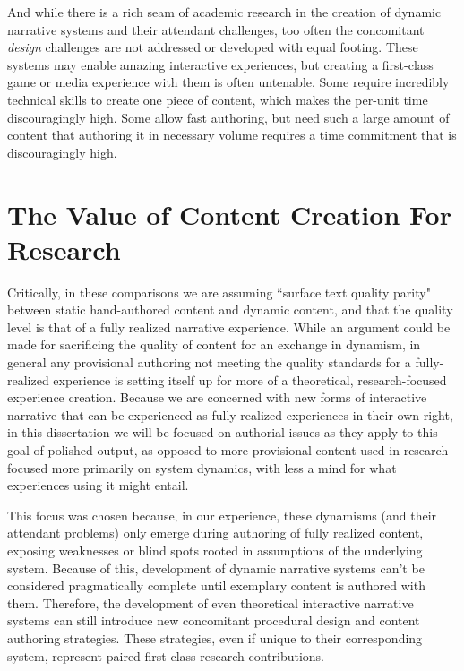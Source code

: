 And while there is a rich seam of academic research in the creation of dynamic narrative systems and their attendant challenges, too often the concomitant \textit{design} challenges are not addressed or developed with equal footing. These systems may enable amazing interactive experiences, but creating a first-class game or media experience with them is often untenable. Some require incredibly technical skills to create one piece of content, which makes the per-unit time discouragingly high. Some allow fast authoring, but need such a large amount of content that authoring it in necessary volume requires a time commitment that is discouragingly high.

\section*{The Value of Content Creation For Research}

Critically, in these comparisons we are assuming ``surface text quality parity" between static hand-authored content and dynamic content, and that the quality level is that of a fully realized narrative experience. While an argument could be made for sacrificing the quality of content for an exchange in dynamism, in general any provisional authoring not meeting the quality standards for a fully-realized experience is setting itself up for more of a theoretical, research-focused experience creation. Because we are concerned with new forms of interactive narrative that can be experienced as fully realized experiences in their own right, in this dissertation we will be focused on authorial issues as they apply to this goal of polished output, as opposed to more provisional content used in research focused more primarily on system dynamics, with less a mind for what experiences using it might entail.

This focus was chosen because, in our experience, these dynamisms (and their attendant problems) only emerge during authoring of fully realized content, exposing weaknesses or blind spots rooted in assumptions of the underlying system. Because of this, development of dynamic narrative systems can't be considered pragmatically complete until exemplary content is authored with them. Therefore, the development of even theoretical interactive narrative systems can still introduce new concomitant procedural design and content authoring strategies. These strategies, even if unique to their corresponding system, represent paired first-class research contributions.

